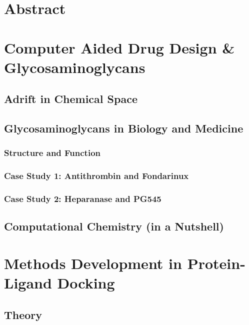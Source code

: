 \documentclass[a4paper, 12pt, openany]{book}
\begin{document}
\chapter*{Abstract}

\newpage

\chapter{Computer Aided Drug Design \& Glycosaminoglycans}
\section{Adrift in Chemical Space}

\section{Glycosaminoglycans in Biology and Medicine}
\subsection{Structure and Function}
\subsection{Case Study 1: Antithrombin and Fondarinux}
\subsection{Case Study 2: Heparanase and PG545}
\newpage

\section{Computational Chemistry (in a Nutshell)}



\chapter{Methods Development in Protein-Ligand Docking}
\section{Theory}
\end{document}
